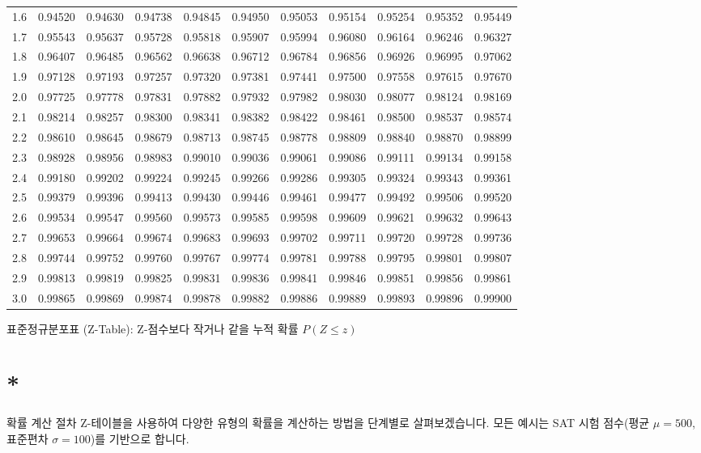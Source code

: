 \documentclass[11pt,a4paper]{article}
\theoremstyle{definition}
\newcommand{\newsection}[1]{\newpage\section{#1}}
\begin{document}
\begin{adjustbox}{width=\textwidth,center}
\begin{tabular}{ccccccccccc}
1.6 & 0.94520 & 0.94630 & 0.94738 & 0.94845 & 0.94950 & 0.95053 & 0.95154 & 0.95254 & 0.95352 & 0.95449 \\
1.7 & 0.95543 & 0.95637 & 0.95728 & 0.95818 & 0.95907 & 0.95994 & 0.96080 & 0.96164 & 0.96246 & 0.96327 \\
1.8 & 0.96407 & 0.96485 & 0.96562 & 0.96638 & 0.96712 & 0.96784 & 0.96856 & 0.96926 & 0.96995 & 0.97062 \\
1.9 & 0.97128 & 0.97193 & 0.97257 & 0.97320 & 0.97381 & 0.97441 & 0.97500 & 0.97558 & 0.97615 & 0.97670 \\
2.0 & 0.97725 & 0.97778 & 0.97831 & 0.97882 & 0.97932 & 0.97982 & 0.98030 & 0.98077 & 0.98124 & 0.98169 \\
2.1 & 0.98214 & 0.98257 & 0.98300 & 0.98341 & 0.98382 & 0.98422 & 0.98461 & 0.98500 & 0.98537 & 0.98574 \\
2.2 & 0.98610 & 0.98645 & 0.98679 & 0.98713 & 0.98745 & 0.98778 & 0.98809 & 0.98840 & 0.98870 & 0.98899 \\
2.3 & 0.98928 & 0.98956 & 0.98983 & 0.99010 & 0.99036 & 0.99061 & 0.99086 & 0.99111 & 0.99134 & 0.99158 \\
2.4 & 0.99180 & 0.99202 & 0.99224 & 0.99245 & 0.99266 & 0.99286 & 0.99305 & 0.99324 & 0.99343 & 0.99361 \\
2.5 & 0.99379 & 0.99396 & 0.99413 & 0.99430 & 0.99446 & 0.99461 & 0.99477 & 0.99492 & 0.99506 & 0.99520 \\
2.6 & 0.99534 & 0.99547 & 0.99560 & 0.99573 & 0.99585 & 0.99598 & 0.99609 & 0.99621 & 0.99632 & 0.99643 \\
2.7 & 0.99653 & 0.99664 & 0.99674 & 0.99683 & 0.99693 & 0.99702 & 0.99711 & 0.99720 & 0.99728 & 0.99736 \\
2.8 & 0.99744 & 0.99752 & 0.99760 & 0.99767 & 0.99774 & 0.99781 & 0.99788 & 0.99795 & 0.99801 & 0.99807 \\
2.9 & 0.99813 & 0.99819 & 0.99825 & 0.99831 & 0.99836 & 0.99841 & 0.99846 & 0.99851 & 0.99856 & 0.99861 \\
3.0 & 0.99865 & 0.99869 & 0.99874 & 0.99878 & 0.99882 & 0.99886 & 0.99889 & 0.99893 & 0.99896 & 0.99900 \\
\bottomrule
\end{tabular}
\caption{표준정규분포표 (Z-Table): Z-점수보다 작거나 같을 누적 확률 $P(Z \le z)$}
\label{tab:z_table}
\end{adjustbox}

\newsection*{확률 계산 절차}
Z-테이블을 사용하여 다양한 유형의 확률을 계산하는 방법을 단계별로 살펴보겠습니다. 모든 예시는 SAT 시험 점수(평균 $\mu=500$, 표준편차 $\sigma=100$)를 기반으로 합니다.
\end{document}
